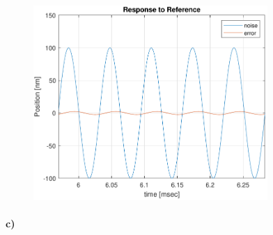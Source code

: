 \documentclass[12pt]{article}
\begin{document}
\begin{figure}[H]
    \begin{center}
        \includegraphics[width=3.5in]{PositionControl-Noise.pdf}
    \end{center}
\end{figure}

\paragraph{c)}
\end{document}
